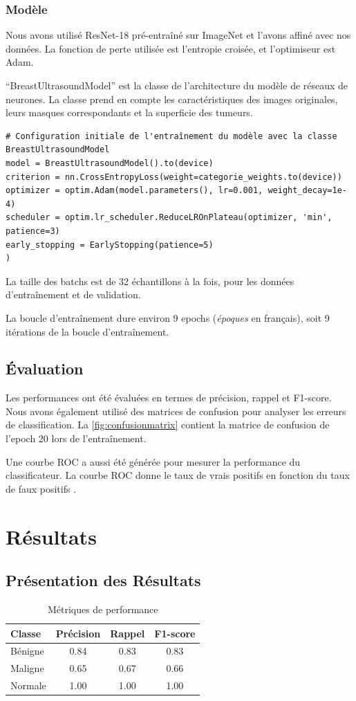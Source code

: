 \documentclass[a4paper,12pt]{article}
\begin{document}
\subsubsection{Modèle}
Nous avons utilisé ResNet-18 pré-entraîné sur ImageNet et l'avons affiné avec nos données. La fonction de perte utilisée est l'entropie croisée, et l'optimiseur est Adam.

\enquote{BreastUltrasoundModel} est la classe de l'architecture du modèle de réseaux de neurones. La classe prend en compte les caractéristiques des images originales, leurs masques correspondants et la superficie des tumeurs.

\begin{verbatim}
# Configuration initiale de l'entraînement du modèle avec la classe BreastUltrasoundModel
model = BreastUltrasoundModel().to(device)
criterion = nn.CrossEntropyLoss(weight=categorie_weights.to(device))
optimizer = optim.Adam(model.parameters(), lr=0.001, weight_decay=1e-4)
scheduler = optim.lr_scheduler.ReduceLROnPlateau(optimizer, 'min', patience=3)
early_stopping = EarlyStopping(patience=5)
)
\end{verbatim}

La taille des batchs est de 32 échantillons à la fois, pour les données d'entraînement et de validation.

La boucle d'entraînement dure environ 9 epochs (\textit{époques} en français), soit 9 itérations de la boucle d'entraînement.

\subsection{Évaluation}
Les performances ont été évaluées en termes de précision, rappel et F1-score. Nous avons également utilisé des matrices de confusion pour analyser les erreurs de classification. La \autoref{fig:confusionmatrix} contient la matrice de confusion de l'epoch 20 lors de l'entraînement.

Une courbe ROC a aussi été générée pour mesurer la performance du classificateur. La courbe ROC donne le taux de vrais positifs en fonction du taux de faux positifs \cite{frwiki:224482682}.

\section{Résultats}

\subsection{Présentation des Résultats}
\begin{table}[h]
\centering
\caption{Métriques de performance}
\begin{tabular}{lccc}
\toprule
Classe & Précision & Rappel & F1-score \\
\midrule
Bénigne & 0.84 & 0.83 & 0.83 \\
Maligne & 0.65 & 0.67 & 0.66 \\
Normale & 1.00 & 1.00 & 1.00 \\
\bottomrule
\end{tabular}
\end{table}
\end{document}
